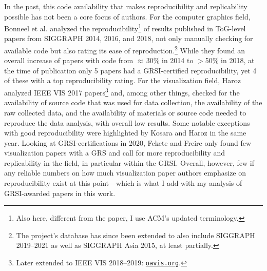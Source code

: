 \documentclass[conference,svgnames]{vgtc}                     %
\begin{document}
In the past, this code availability that makes reproducibility and replicability possible has not been a core focus of authors. For the computer graphics field, Bonneel et al. \cite{Bonneel:2020:CRC} analyzed the reproducibility\footnote{Also here, different from the paper, I use ACM's updated terminology.} of results published in ToG-level papers from SIGGRAPH 2014, 2016, and 2018, not only manually checking for available code but also rating its ease of reproduction.\footnote{The project's database has since been extended to also include SIGGRAPH 2019--2021 as well as SIGGRAPH Asia 2015, at least partially.} While they found an overall increase of papers with code from $\approx$\,30\% in 2014 to $>$50\% in 2018, at the time of publication only 5 papers had a GRSI-certified reproducibility, yet 4 of these with a top reproducibility rating. For the visualization field, Haroz \cite{Haroz:2018:OPV} analyzed IEEE VIS 2017 papers\footnote{Later extended to IEEE VIS 2018--2019: \href{http://oavis.org/}{\texttt{oavis.org}}.} and, among other things, checked for the availability of source code that was used for data collection, the availability of the raw collected data, and the availability of materials or source code needed to reproduce the data analysis, with overall low results. Some notable exceptions with good reproducibility were highlighted by Kosara and Haroz \cite{Kosara:2018:SRC} in the same year. Looking at GRSI-certifications in 2020, Fekete and Freire \cite{Fekete:2020:ERV} only found few visualization papers with a GRS and call for more reproducibility and replicability in the field, in particular within the GRSI. Overall, however, few if any reliable numbers on how much visualization paper authors emphasize on reproducibility exist at this point---which is what I add with my analysis of GRSI-awarded papers in this work.
\end{document}
